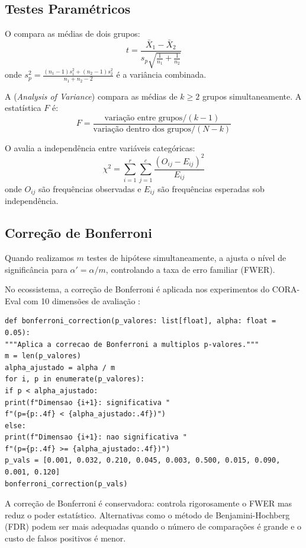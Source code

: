 \subsection{Testes Paramétricos}
\begin{definicao}
O  compara as médias de dois grupos:
\[t = \frac{\bar{X}_1 - \bar{X}_2}{s_p \sqrt{\frac{1}{n_1} + \frac{1}{n_2}}}
\]
onde $s_p^2 = \frac{(n_1-1)s_1^2 + (n_2-1)s_2^2}{n_1 + n_2 - 2}$ é a
variância combinada.
\end{definicao}
\begin{definicao}[ANOVA]
A  (\textit{Analysis of Variance}) compara as médias de
$k \geq 2$ grupos simultaneamente. A estatística $F$ é:
\[F = \frac{\text{variação entre grupos} / (k-1)}
{\text{variação dentro dos grupos} / (N - k)}
\]
\end{definicao}
\begin{definicao}
O  avalia a independência entre variáveis
categóricas:
\[\chi^2 = \sum_{i=1}^{r} \sum_{j=1}^{c}
\frac{(O_{ij} - E_{ij})^2}{E_{ij}}
\]
onde $O_{ij}$ são frequências observadas e $E_{ij}$ são frequências
esperadas sob independência.
\end{definicao}
\subsection{Correção de Bonferroni}
\begin{definicao}
Quando realizamos $m$ testes de hipótese simultaneamente, a
 ajusta o nível de significância para
$\alpha' = \alpha / m$, controlando a taxa de erro familiar (FWER).
\end{definicao}
\begin{exemplo}
No ecossistema, a correção de Bonferroni é aplicada nos experimentos
do CORA-Eval com 10 dimensões de avaliação \cite{laranjeira2026cora}:
\begin{lstlisting}[style=pythonstyle]
def bonferroni_correction(p_valores: list[float], alpha: float = 0.05):
"""Aplica a correcao de Bonferroni a multiplos p-valores."""
m = len(p_valores)
alpha_ajustado = alpha / m
for i, p in enumerate(p_valores):
if p < alpha_ajustado:
print(f"Dimensao {i+1}: significativa "
f"(p={p:.4f} < {alpha_ajustado:.4f})")
else:
print(f"Dimensao {i+1}: nao significativa "
f"(p={p:.4f} >= {alpha_ajustado:.4f})")
p_vals = [0.001, 0.032, 0.210, 0.045, 0.003, 0.500, 0.015, 0.090, 0.001, 0.120]
bonferroni_correction(p_vals)
\end{lstlisting}
\end{exemplo}
\begin{observacao}
A correção de Bonferroni é conservadora: controla rigorosamente o FWER
mas reduz o poder estatístico. Alternativas como o método de
Benjamini-Hochberg (FDR) podem ser mais adequadas quando o número de
comparações é grande e o custo de falsos positivos é menor.
\end{observacao}
